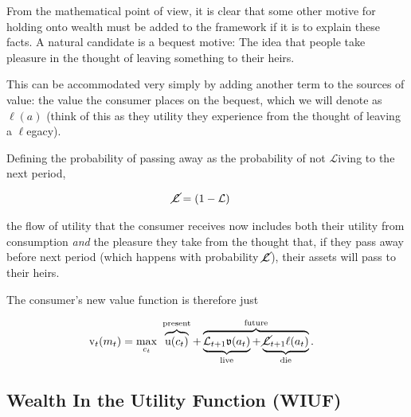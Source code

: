\documentclass{article}
\newcommand{\uFunc}{\mathrm{u}}
\newcommand{\vFunc}{\mathrm{v}}
\newcommand{\Alive}{\mathcal{L}}
\newcommand{\cNrm}{c}
\newcommand{\aNrm}{a}
\newcommand{\mNrm}{m}
\begin{document}
From the mathematical point of view, it is clear that some other motive for holding onto wealth must be added to the framework if it is to explain these facts. A natural candidate is a bequest motive: The idea that people take pleasure in the thought of leaving something to their heirs.

This can be accommodated very simply by adding another term to the sources of value: the value the consumer places on the bequest, which we will denote as $\ell(\aNrm)$ (think of this as they utility they experience from the thought of leaving a $\ell$egacy).

Defining the probability of passing away as the probability of not $\Alive$iving to the next period,

\begin{equation}
\begin{align}
    \cancel{\Alive} & =(1-\Alive)
\end{align}
\end{equation}

the flow of utility that the consumer receives now includes both their utility from consumption \textit{and} the pleasure they take from the thought that, if they pass away before next period (which happens with probability $\cancel{\Alive}$), their assets will pass to their heirs.

The consumer's new value function is therefore just

\begin{equation}
\begin{align}
    {\vFunc}_{t}({\mNrm}_{t}) & = \max_{\cNrm_{t}} ~ \overbrace{\uFunc(\cNrm_{t})}^{\text{present}}+\overbrace{\underbrace{\Alive_{t+1}\mathfrak{v}(\aNrm_{t})}_{\text{live}} + \underbrace{\cancel{\Alive}_{t+1}\ell({\aNrm}_{t})}_{\text{die}}
    }^{\text{future}}.
\end{align}
\end{equation}


\subsection{Wealth In the Utility Function (WIUF)}
\end{document}
